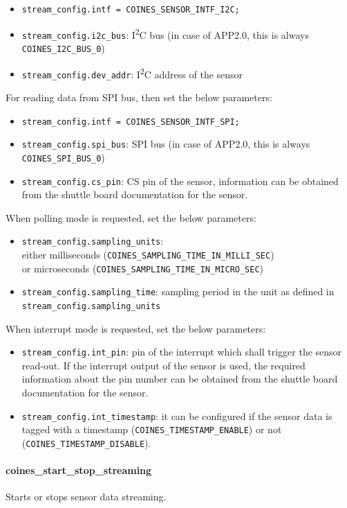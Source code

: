 	\begin{itemize}
		\item \texttt{stream\_config.intf = COINES\_SENSOR\_INTF\_I2C;}
		\item \texttt{stream\_config.i2c\_bus}: I\textsuperscript{2}C bus (in case of APP2.0, this is always \texttt{COINES\_I2C\_BUS\_0})
		\item \texttt{stream\_config.dev\_addr}: I\textsuperscript{2}C address of the sensor
	\end{itemize}
For reading data from SPI bus, then set the below parameters:
	\begin{itemize}
		\item \texttt{stream\_config.intf = COINES\_SENSOR\_INTF\_SPI;}
		\item \texttt{stream\_config.spi\_bus}: SPI bus (in case of APP2.0, this is always \texttt{COINES\_SPI\_BUS\_0})
		\item \texttt{stream\_config.cs\_pin}: CS pin of the sensor, information can be obtained from the shuttle board documentation for the sensor. 
	\end{itemize}
When polling mode is requested, set the below parameters:
	\begin{itemize}
		\item \texttt{stream\_config.sampling\_units}: \\ either milliseconds (\texttt{COINES\_SAMPLING\_TIME\_IN\_MILLI\_SEC}) \\ or microseconds (\texttt{COINES\_SAMPLING\_TIME\_IN\_MICRO\_SEC})
		\item \texttt{stream\_config.sampling\_time}: sampling period in the unit as defined in \\ \texttt{stream\_config.sampling\_units}
	\end{itemize}
When interrupt mode is requested, set the below parameters:
	\begin{itemize}
		\item \texttt{stream\_config.int\_pin}: pin of the interrupt which shall trigger the sensor read-out. If the interrupt output of the sensor is used, the required information about the pin number can be obtained from the shuttle board documentation for the sensor.
		\item \texttt{stream\_config.int\_timestamp}:  it can be configured if the sensor data is tagged with a timestamp (\texttt{COINES\_TIMESTAMP\_ENABLE}) or not (\texttt{COINES\_TIMESTAMP\_DISABLE}).
	\end{itemize}

\paragraph{coines\_start\_stop\_streaming}
Starts or stops sensor data streaming.

